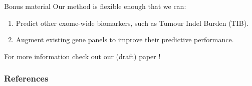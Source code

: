 \documentclass{beamer}
\begin{document}
\begin{frame}{Bonus material}
Our method is flexible enough that we can:
\begin{enumerate}
    \item Predict other exome-wide biomarkers, such as Tumour Indel Burden (TIB).
    \item Augment existing gene panels to improve their predictive performance.
\end{enumerate}
For more information check out our (draft) paper \cite{bradley_data-driven_2021}!
\end{frame}

\appendix
\begin{frame}[allowframebreaks]
        \frametitle{References}
        
\end{frame}
\end{document}
